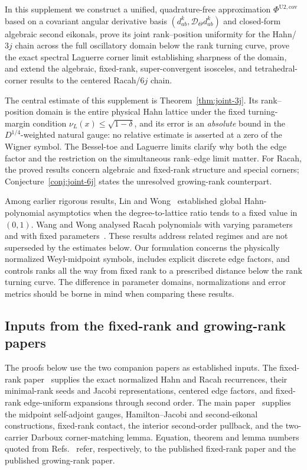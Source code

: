 \documentclass[11pt]{article}
\theoremstyle{definition}
\theoremstyle{remark}
\newcommand{\cD}{\mathcal{D}}
\renewcommand{\_}{\oldunderscore\penalty0\hskip0pt\relax}
\begin{document}
In this supplement we construct a unified, quadrature-free approximation $\Phi^{\mathrm{U2,cov}}$ based on a covariant angular
  derivative basis $(d^k_{ab},\cD_\Theta d^k_{ab})$ and closed-form algebraic second eikonals, prove its joint rank--position
  uniformity for the Hahn/$3j$ chain across the full oscillatory domain below the rank turning curve, prove the exact spectral
  Laguerre corner limit establishing sharpness of the domain, and extend the algebraic, fixed-rank, super-convergent isosceles,
  and tetrahedral-corner results to the centered Racah/$6j$ chain.

The central estimate of this supplement is Theorem~\ref{thm:joint-3j}. Its rank--position domain is the entire physical Hahn lattice under the fixed
  turning-margin condition $\nu_L(x)\le\sqrt{1-\delta}$, and its error is an \emph{absolute} bound in the $D^{1/4}$-weighted natural gauge: no relative
  estimate is asserted at a zero of the Wigner symbol. The Bessel-toe and Laguerre limits clarify why both the edge factor and
  the restriction on the simultaneous rank--edge limit matter. For Racah, the proved results concern algebraic and fixed-rank
  structure and special corners; Conjecture~\ref{conj:joint-6j} states the unresolved growing-rank counterpart.

Among earlier rigorous results, Lin and Wong~\cite{LinWong2013} established global Hahn-polynomial asymptotics when the degree-to-lattice ratio tends to a fixed
  value in $(0,1)$. Wang and Wong analysed Racah polynomials with varying parameters~\cite{WangWong2016} and with fixed
  parameters~\cite{WangWong2018}. These results address related regimes and are not superseded by the estimates below. Our
  formulation concerns the physically normalized Weyl-midpoint symbols, includes explicit discrete edge factors, and controls
  ranks all the way from fixed rank to a prescribed distance below the rank turning curve. The difference in parameter domains,
  normalizations and error metrics should be borne in mind when comparing these results.

\subsection{Inputs from the fixed-rank and growing-rank papers}
The proofs below use the two companion papers as established inputs. The fixed-rank paper~\cite{LewisFixedRank} supplies the exact normalized Hahn
  and Racah recurrences, their minimal-rank seeds and Jacobi representations, centered edge factors, and fixed-rank edge-uniform
  expansions through second order. The main paper~\cite{LewisGrowingRank} supplies the midpoint self-adjoint gauges, Hamilton--Jacobi and
  second-eikonal constructions, fixed-rank contact, the interior second-order pullback, and the two-carrier Darboux
  corner-matching lemma. Equation, theorem and lemma numbers quoted from Refs.~\cite{LewisFixedRank,LewisGrowingRank} refer, respectively, to the published fixed-rank paper and the published growing-rank paper.
\end{document}
